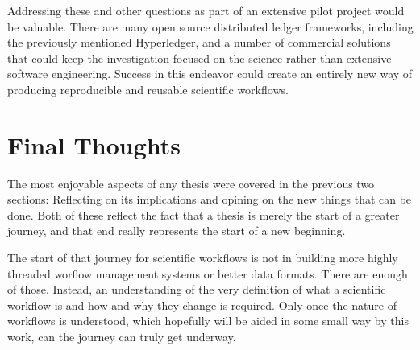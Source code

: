 Addressing these and other questions as part of an extensive pilot project would
be valuable. There are many open source distributed ledger frameworks, including
the previously mentioned Hyperledger, and a number of commercial solutions that
could keep the investigation focused on the science rather than extensive
software engineering. Success in this endeavor could create an entirely new way
of producing reproducible and reusable scientific workflows.

\section{Final Thoughts}

The most enjoyable aspects of any thesis were covered in the previous two
sections: Reflecting on its implications and opining on the new things that
can be done. Both of these reflect the fact that a thesis is merely the start
of a greater journey, and that end really represents the start of a new
beginning.

The start of that journey for scientific workflows is not in building more
highly threaded worflow management systems or better data formats. There are
enough of those. Instead, an understanding of the very definition of what a
scientific workflow is and how and why they change is required. Only once the
nature of workflows is understood, which hopefully will be aided in some small
way by this work, can the journey can truly get underway.

\listoftodos